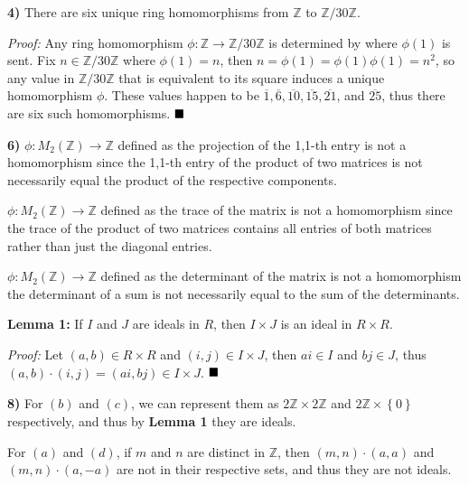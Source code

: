 \documentclass[12pt]{article}
\newcommand{\Z}{\mathbb{Z}}
\newcommand{\braceb}[1]{\left\{#1\right\}}
\newcommand{\ovl}[1]{\overline{#1}}
\newcommand{\proof}{\textit{Proof: }}
\newcommand{\done}{\ensuremath{\strut\hfill\blacksquare}}
\begin{document}
\textbf{4)} There are six unique ring homomorphisms from \( \Z \) to
\( \Z/30\Z \).

\proof
Any ring homomorphism \( \phi : \Z \to \Z/30\Z \) is determined
by where \( \phi(1) \) is sent.
Fix \( n \in \Z/30\Z \) where \( \phi(1) = n \), then
\( n = \phi(1) = \phi(1)\phi(1) = n^2 \), so any value in \( \Z/30\Z \)
that is equivalent to its square induces a unique homomorphism \( \phi \).
These values happen to be \( \ovl1, \ovl6, \ovl{10}, \ovl{15}, \ovl{21} \),
and \( \ovl{25} \), thus there are six such homomorphisms.
\done

\textbf{6)}
\( \phi : M_2(\Z) \to \Z \) defined as the projection of the 1,1-th entry is
not a homomorphism since the 1,1-th entry of the product of two matrices is not
necessarily equal the product of the respective components.

\( \phi : M_2(\Z) \to \Z \) defined as the trace of the matrix is not a
homomorphism since the trace of the product of two matrices contains all
entries of both matrices rather than just the diagonal entries.

\( \phi : M_2(\Z) \to \Z \) defined as the determinant of the matrix is not a
homomorphism the determinant of a sum is not necessarily equal to the sum of
the determinants.

\textbf{Lemma 1:}
If \( I \) and \( J \) are ideals in \( R \), then \( I \times J \) is an ideal
in \( R \times R \).

\proof
Let \( (a, b) \in R \times R \) and \( (i, j) \in I \times J \), then
\( ai \in I \) and \( bj \in J \), thus
\( (a, b) \cdot (i, j) = (ai, bj) \in I \times J \).
\done

\textbf{8)}
For \( (b) \) and \( (c) \), we can represent them as \( 2\Z \times 2\Z \) and
\( 2\Z \times \braceb{0} \) respectively, and thus by \textbf{Lemma 1} they are
ideals.

For \( (a) \) and \( (d) \), if \( m \) and \( n \) are distinct in \( \Z \),
then \( (m, n) \cdot (a, a) \) and \( (m, n) \cdot (a, -a) \) are not in their
respective sets, and thus they are not ideals.
\end{document}
